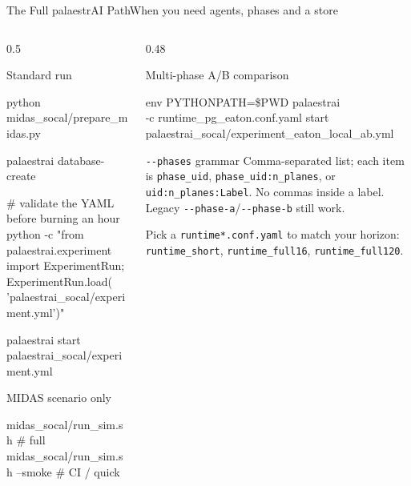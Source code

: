 \documentclass[aspectratio=169,9pt]{beamer}
\newcommand{\code}[1]{{\small\texttt{#1}}}
\begin{document}
\begin{frame}[fragile]{The Full palaestrAI Path}{When you need agents, phases and a store}
  \begin{columns}[T,onlytextwidth]
    \begin{column}{0.5\textwidth}
      \begin{block}{Standard run}
\begin{semiverbatim}\tiny
python midas_socal/prepare_midas.py

palaestrai database-create

\textcolor{csladarkgray}{# validate the YAML before burning an hour}
python -c "from palaestrai.experiment \\
  import ExperimentRun; \\
  ExperimentRun.load(
    'palaestrai_socal/experiment.yml')"

palaestrai start palaestrai_socal/experiment.yml
\end{semiverbatim}
      \end{block}
      \begin{block}{MIDAS scenario only}
\begin{semiverbatim}\tiny
midas_socal/run_sim.sh            \textcolor{csladarkgray}{# full}
midas_socal/run_sim.sh --smoke    \textcolor{csladarkgray}{# CI / quick}
\end{semiverbatim}
      \end{block}
    \end{column}
    \begin{column}{0.48\textwidth}
      \begin{block}{Multi-phase A/B comparison}
\begin{semiverbatim}\tiny
env PYTHONPATH=\$PWD palaestrai \\
  -c runtime_pg_eaton.conf.yaml start \\
  palaestrai_socal/experiment_eaton_local_ab.yml
\end{semiverbatim}
      \end{block}
      \begin{alertblock}{\texttt{-\/-phases} grammar}
        \small Comma-separated list; each item is
        \code{phase\_uid}, \code{phase\_uid:n\_planes}, or
        \code{uid:n\_planes:Label}.
        \vskip2pt
        No commas inside a label. Legacy
        \code{-\/-phase-a}/\code{-\/-phase-b} still work.
      \end{alertblock}
      \vskip2pt
      {\scriptsize\color{csladarkgray}Pick a \texttt{runtime*.conf.yaml} to
       match your horizon: \texttt{runtime\_short}, \texttt{runtime\_full16},
       \texttt{runtime\_full120}.}
    \end{column}
  \end{columns}
\end{frame}
\end{document}
